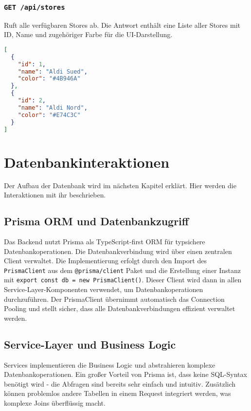 \subsubsection{\texttt{GET /api/stores}}

Ruft alle verfügbaren Stores ab. Die Antwort enthält eine Liste aller Stores mit ID, Name und zugehöriger Farbe für die UI-Darstellung.

\begin{lstlisting}[language=JSON]
[
  {
    "id": 1,
    "name": "Aldi Sued",
    "color": "#4B946A"
  },
  {
    "id": 2,
    "name": "Aldi Nord", 
    "color": "#E74C3C"
  }
]
\end{lstlisting}

\section{Datenbankinteraktionen}

Der Aufbau der Datenbank wird im nächsten Kapitel erklärt. Hier werden die Interaktionen mit ihr beschrieben.

\subsection{Prisma ORM und Datenbankzugriff}

Das Backend nutzt Prisma als TypeScript-first ORM für typsichere Datenbankoperationen. Die Datenbankverbindung wird über einen zentralen Client verwaltet. Die Implementierung erfolgt durch den Import des \texttt{PrismaClient} aus dem \texttt{@prisma/client} Paket und die Erstellung einer Instanz mit \texttt{export const db = new PrismaClient()}. Dieser Client wird dann in allen Service-Layer-Komponenten verwendet, um Datenbankoperationen durchzuführen. Der PrismaClient übernimmt automatisch das Connection Pooling und stellt sicher, dass alle Datenbankverbindungen effizient verwaltet werden.

\subsection{Service-Layer und Business Logic}

Services implementieren die Business Logic und abstrahieren komplexe Datenbankoperationen. Ein großer Vorteil von Prisma ist, dass keine SQL-Syntax benötigt wird - die Abfragen sind bereits sehr einfach und intuitiv. Zusätzlich können problemlos andere Tabellen in einem Request integriert werden, was komplexe Joins überflüssig macht.

